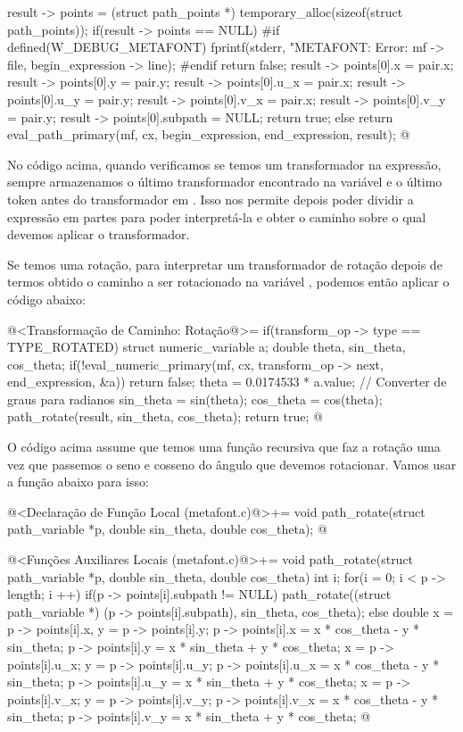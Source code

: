 {{{    result -> points = (struct path_points *)
                         temporary_alloc(sizeof(struct path_points));
    if(result -> points == NULL){
#if defined(W_DEBUG_METAFONT)
      fprintf(stderr, "METAFONT: Error: %
              mf -> file, begin_expression -> line);
#endif
      return false;
    }
    result -> points[0].x = pair.x;
    result -> points[0].y = pair.y;
    result -> points[0].u_x = pair.x;
    result -> points[0].u_y = pair.y;
    result -> points[0].v_x = pair.x;
    result -> points[0].v_y = pair.y;
    result -> points[0].subpath = NULL;
    return true;    
  }
  else
    return eval_path_primary(mf, cx, begin_expression, end_expression,
                             result);
}
@
\fimcodigo

No código acima, quando verificamos se temos um transformador na
expressão, sempre armazenamos o último transformador encontrado na
variável  e o último token antes do
transformador em . Isso nos permite
depois poder dividir a expressão em partes para poder interpretá-la e
obter o caminho sobre o qual devemos aplicar o transformador.

Se temos uma rotação, para interpretar um transformador de rotação
depois de termos obtido o caminho a ser rotacionado na
variável , podemos então aplicar o código abaixo:

\iniciocodigo
@<Transformação de Caminho: Rotação@>=
if(transform_op -> type == TYPE_ROTATED){
  struct numeric_variable a;
  double theta, sin_theta, cos_theta;
  if(!eval_numeric_primary(mf, cx, transform_op -> next, end_expression,
                          &a))
    return false;
  theta = 0.0174533 * a.value; // Converter de graus para radianos
  sin_theta = sin(theta);
  cos_theta = cos(theta);
  path_rotate(result, sin_theta, cos_theta);
  return true;
}
@
\fimcodigo

O código acima assume que temos uma função recursiva que faz a rotação
uma vez que passemos o seno e cosseno do ângulo que devemos
rotacionar. Vamos usar a função abaixo para isso:


\iniciocodigo
@<Declaração de Função Local (metafont.c)@>+=
void path_rotate(struct path_variable *p, double sin_theta,
                 double cos_theta);
@
\fimcodigo

\iniciocodigo
@<Funções Auxiliares Locais (metafont.c)@>+=
void path_rotate(struct path_variable *p, double sin_theta,
                 double cos_theta){
  int i;
  for(i = 0; i < p -> length; i ++){
    if(p -> points[i].subpath != NULL)
      path_rotate((struct path_variable *) (p -> points[i].subpath),
                  sin_theta, cos_theta);
    else{
      double x = p -> points[i].x, y = p -> points[i].y;
      p -> points[i].x = x * cos_theta - y * sin_theta;
      p -> points[i].y = x * sin_theta + y * cos_theta;
      x = p -> points[i].u_x;
      y = p -> points[i].u_y;
      p -> points[i].u_x = x * cos_theta - y * sin_theta;
      p -> points[i].u_y = x * sin_theta + y * cos_theta;
      x = p -> points[i].v_x;
      y = p -> points[i].v_y;
      p -> points[i].v_x = x * cos_theta - y * sin_theta;
      p -> points[i].v_y = x * sin_theta + y * cos_theta;
    }
  }
}
@
\fimcodigo

}
